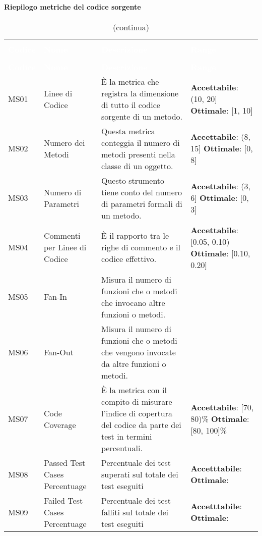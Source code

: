 \paragraph*{Riepilogo metriche del codice sorgente}
\begin{longtable}{C{3cm} C{4cm} L{4cm} C{3cm}}
\caption{Tabella delle metriche del codice sorgente}\\
	\textcolor{white}{\textbf{Codice}} &
	\textcolor{white}{\textbf{Nome}} &
	\textcolor{white}{\textbf{Descrizione}} &
	\textcolor{white}{\textbf{Range}} \\
		\endfirsthead
		\caption[]{(continua)} \\
\textcolor{white}{\textbf{Codice}} &
\textcolor{white}{\textbf{Nome}} &
\textcolor{white}{\textbf{Descrizione}} &
\textcolor{white}{\textbf{Range}} \\
		\endhead
MS01 &
Linee di Codice &
È la metrica che registra la dimensione di tutto il codice sorgente di un metodo. &
\textbf{Accettabile}: (10, 20]
\textbf{Ottimale}: [1, 10] \\
MS02 &
Numero dei Metodi &
Questa metrica conteggia il numero di metodi presenti nella classe di un oggetto. & 
\textbf{Accettabile}: (8, 15]
\textbf{Ottimale}: [0, 8] \\

MS03 &
Numero di Parametri &
Questo strumento tiene conto del numero di parametri formali di un metodo. &
\textbf{Accettabile}: (3, 6]
\textbf{Ottimale}: [0, 3] \\

MS04 &
Commenti per Linee di Codice &
È il rapporto tra le righe di commento e il codice effettivo. &
\textbf{Accettabile}: [0.05, 0.10)
\textbf{Ottimale}: [0.10, 0.20] \\


MS05 & 
Fan-In & 
Misura il numero di funzioni che o metodi che invocano altre funzioni o metodi. &
 \\

MS06 & 
Fan-Out & 
Misura il numero di funzioni che o metodi che vengono invocate da altre funzioni o metodi. &
 \\

MS07 & 
Code Coverage &
È la metrica con il compito di misurare l'indice di copertura del codice da parte dei test in termini percentuali. &
\textbf{Accettabile}: [70, 80)\%
\textbf{Ottimale}: [80, 100]\% \\


MS08 &
Passed Test Cases  Percentuage &
Percentuale dei test superati sul totale dei test eseguiti &
\textbf{Accetttabile}:
\textbf{Ottimale}: \\

MS09 &
Failed Test Cases  Percentuage &
Percentuale dei test falliti sul totale dei test eseguiti &
\textbf{Accetttabile}:
\textbf{Ottimale}: \\
\end{longtable}

